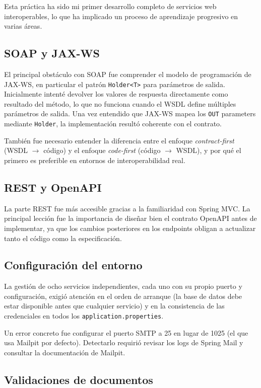 \documentclass[12pt, a4paper]{article}
\begin{document}
Esta práctica ha sido mi primer desarrollo completo de servicios web interoperables, lo que ha implicado un proceso de aprendizaje progresivo en varias áreas.

\subsection{SOAP y JAX-WS}

El principal obstáculo con SOAP fue comprender el modelo de programación de JAX-WS, en particular el patrón \texttt{Holder<T>} para parámetros de salida. Inicialmente intenté devolver los valores de respuesta directamente como resultado del método, lo que no funciona cuando el WSDL define múltiples parámetros de salida. Una vez entendido que JAX-WS mapea los \texttt{OUT} parameters mediante \texttt{Holder}, la implementación resultó coherente con el contrato.

También fue necesario entender la diferencia entre el enfoque \textit{contract-first} (WSDL $\to$ código) y el enfoque \textit{code-first} (código $\to$ WSDL), y por qué el primero es preferible en entornos de interoperabilidad real.

\subsection{REST y OpenAPI}

La parte REST fue más accesible gracias a la familiaridad con Spring MVC. La principal lección fue la importancia de diseñar bien el contrato OpenAPI antes de implementar, ya que los cambios posteriores en los endpoints obligan a actualizar tanto el código como la especificación.

\subsection{Configuración del entorno}

La gestión de ocho servicios independientes, cada uno con su propio puerto y configuración, exigió atención en el orden de arranque (la base de datos debe estar disponible antes que cualquier servicio) y en la consistencia de las credenciales en todos los \texttt{application.properties}.

Un error concreto fue configurar el puerto SMTP a 25 en lugar de 1025 (el que usa Mailpit por defecto). Detectarlo requirió revisar los logs de Spring Mail y consultar la documentación de Mailpit.

\subsection{Validaciones de documentos}
\end{document}
